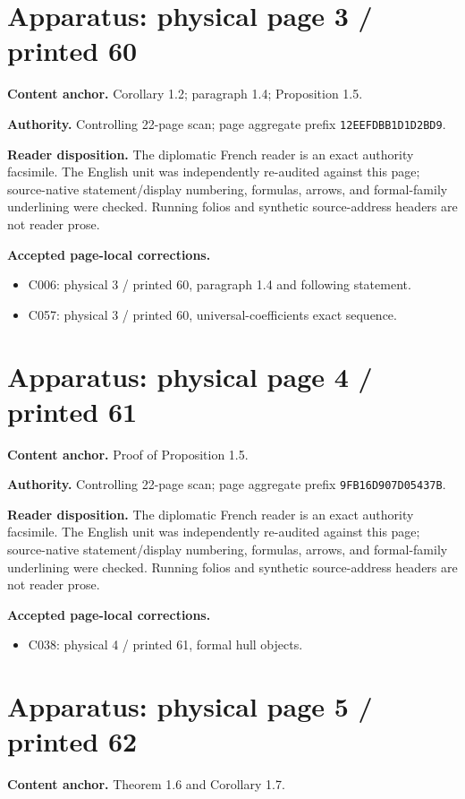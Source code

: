 \documentclass[10pt]{article}
\begin{document}
\section*{Apparatus: physical page 3 / printed 60}
\textbf{Content anchor.} Corollary 1.2; paragraph 1.4; Proposition 1.5.

\textbf{Authority.} Controlling 22-page scan; page aggregate prefix \texttt{12EEFDBB1D1D2BD9}.

\textbf{Reader disposition.} The diplomatic French reader is an exact authority facsimile. The English unit was independently re-audited against this page; source-native statement/display numbering, formulas, arrows, and formal-family underlining were checked. Running folios and synthetic source-address headers are not reader prose.

\textbf{Accepted page-local corrections.} \begin{itemize}
\item C006: physical 3 / printed 60, paragraph 1.4 and following statement.
\item C057: physical 3 / printed 60, universal-coefficients exact sequence.
\end{itemize}
\newpage
\setcounter{footnote}{0}
\fontsize{10.2pt}{12.04pt}\selectfont
\section*{Apparatus: physical page 4 / printed 61}
\textbf{Content anchor.} Proof of Proposition 1.5.

\textbf{Authority.} Controlling 22-page scan; page aggregate prefix \texttt{9FB16D907D05437B}.

\textbf{Reader disposition.} The diplomatic French reader is an exact authority facsimile. The English unit was independently re-audited against this page; source-native statement/display numbering, formulas, arrows, and formal-family underlining were checked. Running folios and synthetic source-address headers are not reader prose.

\textbf{Accepted page-local corrections.} \begin{itemize}
\item C038: physical 4 / printed 61, formal hull objects.
\end{itemize}
\newpage
\setcounter{footnote}{0}
\fontsize{10.2pt}{12.04pt}\selectfont
\section*{Apparatus: physical page 5 / printed 62}
\textbf{Content anchor.} Theorem 1.6 and Corollary 1.7.
\end{document}
